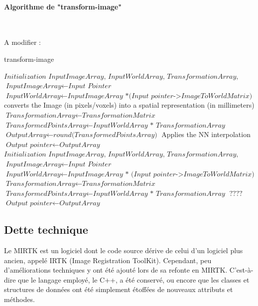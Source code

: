 \documentclass[10pt]{report}
\begin{document}
	
	\paragraph{Algorithme de "transform-image"}
~\par
	A modifier :
	\begin{algorithm}[H]
	\caption{transform-image}\label{transform-image}
		\begin{algorithmic}[1]
			\State $\textit{Initialization InputImageArray, InputWorldArray, TransformationArray, OutputArray}$
			\State $\textit{InputImageArray} \gets \textit{Input Pointer}$
			\State $\textit{InputWorldArray} \gets \textit{InputImageArray *(Input pointer->ImageToWorldMatrix)}$ 
			\State \Comment converts the Image (in pixels/voxels) into a spatial representation (in millimeters)
			\State $\textit{TransformationArray} \gets \textit{TransformationMatrix}$
			\State $\textit{TransformedPointsArray} \gets \textit{InputWorldArray *  TransformationArray}$ 
			\State $\textit{OutputArray} \gets \textit{round(TransformedPointsArray)}$ \Comment Applies the NN interpolation 
			\State $\textit{Output pointer} \gets \textit{OutputArray}$
			\EndProcedure
			\State $ $
			\State $\textit{Initialization InputImageArray, InputWorldArray, TransformationArray, OutputArray}$
			\State $\textit{InputImageArray} \gets \textit{Input Pointer}$
			\State $\textit{InputWorldArray} \gets \textit{InputImageArray * (Input pointer->ImageToWorldMatrix)}$
			\State $\textit{TransformationArray} \gets \textit{TransformationMatrix}$
			\State $\textit{TransformedPointsArray} \gets \textit{InputWorldArray * TransformationArray}$
		    \State $ ???? $
			\State $\textit{Output pointer} \gets \textit{OutputArray}$
			\EndProcedure
		\end{algorithmic}
	\end{algorithm}

	\subsection{Dette technique}

	Le MIRTK est un logiciel dont le code source dérive de celui d'un logiciel plus ancien, appelé IRTK (Image Registration ToolKit). Cependant, peu d'améliorations techniques y ont été ajouté lors de sa refonte en MIRTK. C'est-à-dire que le langage employé, le C++, a été conservé, ou encore que les classes et structures de données ont été simplement étoffées de nouveaux attributs et méthodes. \\
	
\end{document}
